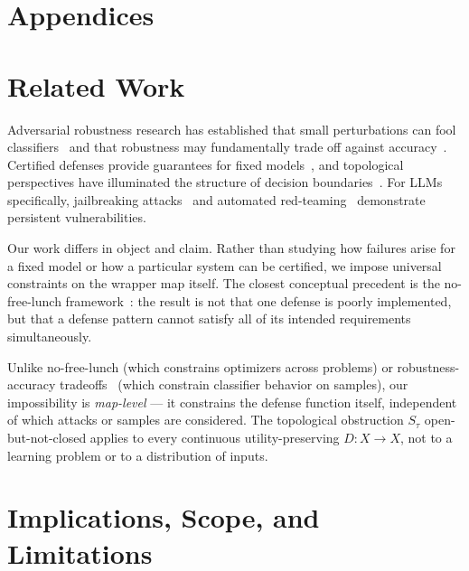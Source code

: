 \documentclass[11pt]{article}
\begin{document}
\newpage
\appendix
\section*{Appendices}

\section{Related Work}
\label{app:related}

Adversarial robustness research has established that small
perturbations can fool classifiers~\cite{szegedy2013intriguing,
goodfellow2014explaining,carlini2017evaluating,madry2018towards} and
that robustness may fundamentally trade off against
accuracy~\cite{tsipras2018robustness,fawzi2018adversarial}. Certified
defenses provide guarantees for fixed
models~\cite{cohen2019certified,katz2017reluplex,singh2019abstract,
huang2017safety,bagnall2019certifying}, and topological perspectives
have illuminated the structure of decision
boundaries~\cite{naitzat2020topology}. For LLMs specifically,
jailbreaking attacks~\cite{zou2023universal,chao2024jailbreaking,
mehrotra2024tree,greshake2023indirect} and automated
red-teaming~\cite{mouret2015illuminating,samvelyan2024rainbow}
demonstrate persistent vulnerabilities.

Our work differs in object and claim. Rather than studying how failures
arise for a fixed model or how a particular system can be certified, we
impose universal constraints on the wrapper map itself. The closest
conceptual precedent is the no-free-lunch
framework~\cite{wolpert1997no}: the result is not that one defense is
poorly implemented, but that a defense pattern cannot satisfy all of
its intended requirements simultaneously.

Unlike no-free-lunch (which constrains optimizers across problems) or
robustness-accuracy tradeoffs~\cite{tsipras2018robustness} (which
constrain classifier behavior on samples), our impossibility is
\emph{map-level} --- it constrains the defense function itself,
independent of which attacks or samples are considered. The
topological obstruction $S_\tau$ open-but-not-closed applies to every
continuous utility-preserving $D\colon X \to X$, not to a learning
problem or to a distribution of inputs.

\section{Implications, Scope, and Limitations}
\label{app:engineering}
\end{document}
